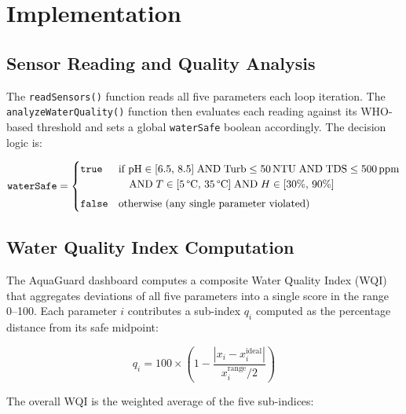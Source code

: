 \documentclass[12pt,a4paper]{article}
\begin{document}
\section{Implementation}
\label{sec:implementation}

\subsection{Sensor Reading and Quality Analysis}

The \texttt{readSensors()} function reads all five parameters
each loop iteration. The \texttt{analyzeWaterQuality()} function
then evaluates each reading against its WHO-based threshold and
sets a global \texttt{waterSafe} boolean accordingly. The
decision logic is:

\begin{equation}
\texttt{waterSafe} =
\begin{cases}
  \texttt{true}  & \text{if } \text{pH} \in [6.5,\,8.5]
                    \;\text{AND}\; \text{Turb} \leq 50\,\text{NTU}
                    \;\text{AND}\; \text{TDS} \leq 500\,\text{ppm} \\
                 & \quad\text{AND}\; T \in [5\,\text{\textdegree C},\,35\,\text{\textdegree C}]
                    \;\text{AND}\; H \in [30\%,\,90\%] \\[4pt]
  \texttt{false} & \text{otherwise (any single parameter violated)}
\end{cases}
\label{eq:safe}
\end{equation}

\subsection{Water Quality Index Computation}

The AquaGuard dashboard computes a composite Water Quality Index
(WQI) that aggregates deviations of all five parameters into a
single score in the range 0--100. Each parameter $i$ contributes
a sub-index $q_i$ computed as the percentage distance from its
safe midpoint:

\begin{equation}
q_i = 100 \times \left(1 - \frac{|x_i - x_i^{\text{ideal}}|}{x_i^{\text{range}}/2}\right)
\label{eq:wqi_sub}
\end{equation}

The overall WQI is the weighted average of the five sub-indices:
\end{document}
